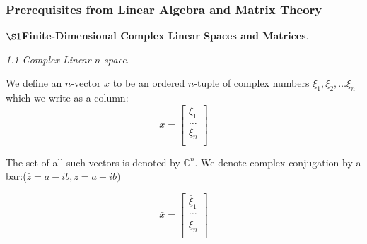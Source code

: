 \documentclass{beamer}
\def\C{{\mathbb C}}
\begin{document}

\begin{frame}
  \frametitle{Prerequisites from Linear Algebra and Matrix Theory}
$ \S 1$\textbf{Finite-Dimensional Complex Linear Spaces and Matrices}.

\textit{1.1 Complex Linear $ n $-space}.

We define an $ n$-vector $ x $ to be an ordered $ n $-tuple of complex
numbers $ \xi_{1},\xi_{2}, \dots \xi_{n} $ which we write as a column:
\begin{equation*}
  x = \begin{bmatrix}
 \xi_{1}  \\[2pt] 
 \ldots \\[2pt] 
 \xi_{n}  \\[2pt] 
\end{bmatrix}
\end{equation*}

The set of all such vectors is denoted by $ \C^{n} $.
We denote complex conjugation by a bar:($ \bar{z} = a -ib, z=a+ib) $

\begin{equation*}
  \bar{x} = \begin{bmatrix}
 \bar{\xi}_{1}  \\[2pt] 
 \ldots \\[2pt] 
 \bar{\xi}_{n}  \\[2pt] 
\end{bmatrix}
\end{equation*}
 
\end{frame}
\end{document}
